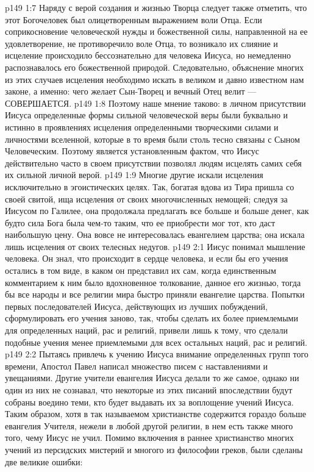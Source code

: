 \vs p149 1:7 \bibnobreakspace Наряду с верой создания и жизнью Творца следует также отметить, что этот Богочеловек был олицетворенным выражением воли Отца. Если соприкосновение человеческой нужды и божественной силы, направленной на ее удовлетворение, не противоречило воле Отца, то возникало их слияние и исцеление происходило бессознательно для человека Иисуса, но немедленно распознавалось его божественной природой. Следовательно, объяснение многих из этих случаев исцеления необходимо искать в великом и давно известном нам законе, а именно: чего желает Сын\hyp{}Творец и вечный Отец велит --- СОВЕРШАЕТСЯ.
\vs p149 1:8 \pc Поэтому наше мнение таково: в личном присутствии Иисуса определенные формы сильной человеческой веры были буквально и истинно  в проявлениях исцеления определенными творческими силами и личностями вселенной, которые в то время были столь тесно связаны с Сыном Человеческим. Поэтому является установленным фактом, что Иисус действительно часто в своем присутствии позволял людям исцелять самих себя их сильной личной верой.
\vs p149 1:9 Многие другие искали исцеления исключительно в эгоистических целях. Так, богатая вдова из Тира пришла со своей свитой, ища исцеления от своих многочисленных немощей; следуя за Иисусом по Галилее, она продолжала предлагать все больше и больше денег, как будто сила Бога была чем\hyp{}то таким, что ее приобрести мог тот, кто даст наибольшую цену. Она вовсе не интересовалась евангелием царства; она искала лишь исцеления от своих телесных недугов.
\vs p149 2:1 Иисус понимал мышление человека. Он знал, что происходит в сердце человека, и если бы его учения остались в том виде, в каком он представил их сам, когда единственным комментарием к ним было вдохновенное толкование, данное его жизнью, тогда бы все народы и все религии мира быстро приняли евангелие царства. Попытки первых последователей Иисуса, действующих из лучших побуждений, сформулировать его учения заново, так, чтобы сделать их более приемлемыми для определенных наций, рас и религий, привели лишь к тому, что сделали подобные учения менее приемлемыми для всех остальных наций, рас и религий.
\vs p149 2:2 Пытаясь привлечь к учению Иисуса внимание определенных групп того времени, Апостол Павел написал множество писем с наставлениями и увещаниями. Другие учители евангелия Иисуса делали то же самое, однако ни один из них не сознавал, что некоторые из этих писаний впоследствии будут собраны воедино теми, кто будет выдавать их за воплощение учений Иисуса. Таким образом, хотя в так называемом христианстве содержится гораздо больше евангелия Учителя, нежели в любой другой религии, в нем есть также много того, чему Иисус не учил. Помимо включения в раннее христианство многих учений из персидских мистерий и многого из философии греков, были сделаны две великие ошибки:
